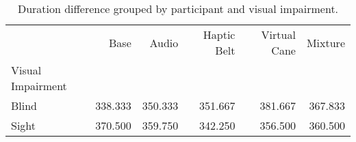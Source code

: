 
\begin{table}[!htb]
\centering
\caption{Duration difference grouped by participant and visual impairment.}
\label{tab:duracao_average_group}
\begin{tabular}{lrrrrr}
\toprule
{} &    Base &   Audio &  Haptic Belt &  Virtual Cane &  Mixture \\
Visual Impairment &         &         &              &               &          \\
\midrule
Blind             & 338.333 & 350.333 &      351.667 &       381.667 &  367.833 \\
Sight             & 370.500 & 359.750 &      342.250 &       356.500 &  360.500 \\
\bottomrule
\end{tabular}
\end{table}


